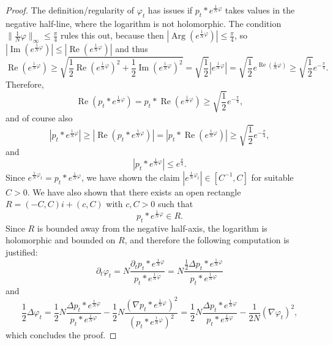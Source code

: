 \documentclass[a4paper,12pt]{article}
\begin{document}
\begin{proof}
    The definition/regularity of $\varphi_t$ has issues if $p_{t} \ast e^{\frac{1}{N} \varphi}$ takes values in the negative half-line, where the logarithm is not holomorphic. The condition $\| \frac{1}{N} \varphi\|_{\infty} \leq \frac{\pi}{4}$ rules this out, because then $| \operatorname{Arg} ( e^{\frac{1}{N} \varphi} )| \leq\frac{\pi}{4}$, so $|\operatorname{Im} ( e^{\frac{1}{N} \varphi} ) | \leq
   | \operatorname{Re} ( e^{\frac{1}{N} \varphi} ) |$ and thus
\begin{equation*}
  \operatorname{Re} \left( e^{\frac{1}{N} \varphi} \right)   \geq \sqrt{\frac{1}{2} \operatorname{Re} \left( e^{\frac{1}{N} \varphi}
  \right)^2 + \frac{1}{2} \operatorname{Im} \left( e^{\frac{1}{N} \varphi}
  \right)^2} = \sqrt{\frac{1}{2}} \left| e^{\frac{1}{N} \varphi} \right| = \sqrt{\frac{1}{2}} e^{ \operatorname{Re}(\frac{1}{N}\varphi)} \geq \sqrt{\frac{1}{2}} e^{- \frac{\pi}{4}} .
\end{equation*}
Therefore,
\[ \operatorname{Re} \left( p_t \ast e^{\frac{1}{N} \varphi} \right) = p_t \ast
   \operatorname{Re} \left( e^{\frac{1}{N} \varphi} \right) \geq
   \sqrt{\frac{1}{2}} e^{- \frac{\pi}{4}}, \]
and of course also
\[ \left| p_t \ast e^{\frac{1}{N} \varphi} \right| \geq \left| \operatorname{Re}
   \left( p_t \ast e^{\frac{1}{N} \varphi} \right) \right| = \left| p_t \ast
   \operatorname{Re} \left( e^{\frac{1}{N} \varphi} \right) \right| \geq
   \sqrt{\frac{1}{2}} e^{- \frac{\pi}{4}}, \]
and
\[ \left| p_t \ast e^{\frac{1}{N} \varphi} \right| \leq e^{\frac{\pi}{4}}
   . \]
Since $e^{\tfrac1N \varphi_t} = p_t \ast e^{\frac{1}{N} \varphi}$, we have shown the claim $|e^{\tfrac1N \varphi_t}| \in [C^{-1},C]$ for suitable $C>0$. We have also shown that there exists
an open rectangle $R = (- C, C) i + (c, C)$ with $c,C>0$ such that
\begin{equation}\label{eq:support-heat-convolution}
    p_t \ast e^{\frac{1}{N} \varphi}  \in R.
\end{equation}
Since $R$ is bounded away from the negative half-axis, the logarithm is holomorphic
and bounded on $R$, and therefore the following computation is justified:
\[
    \partial_t \varphi_t = N \frac{\partial_t p_t \ast e^{\frac{1}{N} \varphi} }{p_t \ast e^{\frac{1}{N} \varphi}} = N \frac{\frac12 \Delta p_t \ast e^{\frac{1}{N} \varphi} }{p_t \ast e^{\frac{1}{N} \varphi}}
\]
and
\[
    \frac12 \Delta \varphi_t = \frac12 N \frac{\Delta p_t \ast e^{\frac1N \varphi}}{p_t \ast e^{\frac{1}{N} \varphi}} - \frac12 N \frac{(\nabla p_t \ast e^{\frac1N \varphi})^2}{(p_t \ast e^{\frac1N \varphi})^2} = \frac12 N \frac{\Delta p_t \ast e^{\frac1N \varphi}}{p_t \ast e^{\frac{1}{N} \varphi}} - \frac{1}{2N} (\nabla \varphi_t)^2,
\]
which concludes the proof. 
\end{proof}
\end{document}
